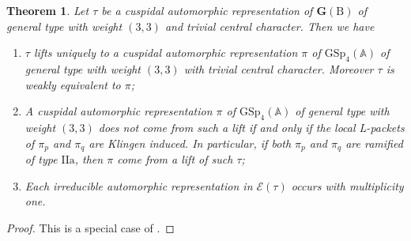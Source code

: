 \documentclass[10pt]{amsart}
\numberwithin{equation}{section}
\newtheorem{theorem}[equation]{Theorem}
\theoremstyle{definition}
\def\GSp{\mathrm{GSp}}
\def\calE{\mathcal{E}}
\def\bfG{\mathbf{G}}
\def\rmB{\mathrm{B}}
\begin{document}
\begin{theorem}\label{mult1-indefinite}
Let $\tau$ be a cuspidal automorphic representation of $\bfG({\rmB})$ of general type with weight $(3, 3)$ and trivial central character. Then we have 
\begin{enumerate}
\item $\tau$ lifts uniquely to a cuspidal automorphic representation $\pi$ of $\GSp_{4}(\mathbb{A})$ of general type with weight $(3, 3)$ with trivial central character. Moreover $\tau$ is weakly equivalent to $\pi$;
\item A cuspidal automorphic representation $\pi$ of $\GSp_{4}(\mathbb{A})$ of general type with weight $(3, 3)$ does not come from such a lift if and only if the local L-packets of $\pi_{p}$ and $\pi_{q}$ are Klingen induced. In particular, if both $\pi_{p}$ and $\pi_{q}$ are ramified of type $\mathrm{IIa}$, then $\pi$ come from a lift of such $\tau$;
\item Each irreducible automorphic representation in $\calE(\tau)$ occurs with multiplicity one.
\end{enumerate}
\end{theorem}
\begin{proof}
This is a special case of  \cite[Theorem 11.5]{RW}.
\end{proof}
\end{document}
